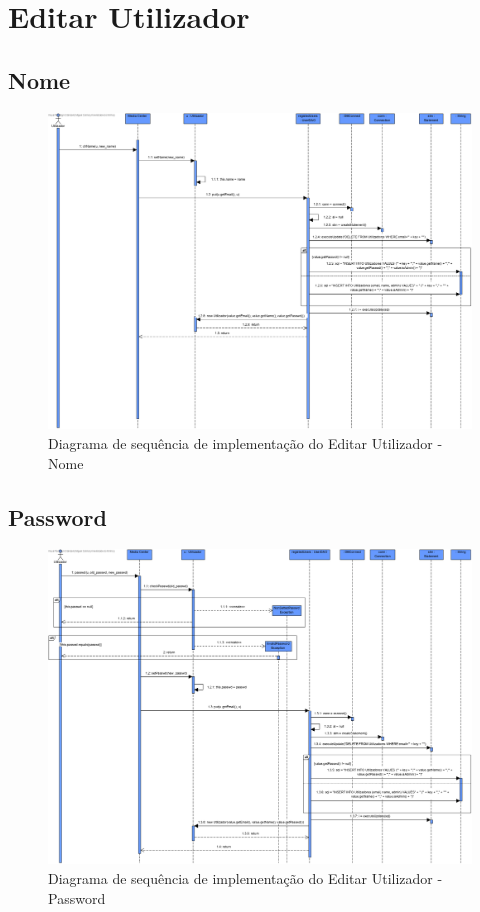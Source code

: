 \documentclass[a4paper]{report}
\begin{document}
\section{Editar Utilizador}

\subsection{Nome}

\begin{figure}[H]
	\centering 
    \includegraphics[width=\textwidth]{images/editUserNameImp.png}  
    \caption{Diagrama de sequência de implementação do Editar Utilizador - Nome}
\end{figure}

\subsection{Password}

\begin{figure}[H]
	\centering 
    \includegraphics[width=\textwidth]{images/editUserPassImp.png}  
    \caption{Diagrama de sequência de implementação do Editar Utilizador - Password}
\end{figure}
\end{document}
